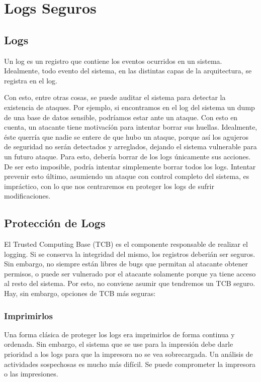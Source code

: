 \section{Logs Seguros}

\subsection{Logs}

Un log es un registro que contiene los eventos ocurridos en un sistema.
Idealmente, todo evento del sistema, en las distintas capas de la arquitectura, se registra en el log.

Con esto, entre otras cosas, se puede auditar el sistema para detectar la existencia de ataques. Por ejemplo, si encontramos en el log del sistema un dump de una base de datos sensible, podríamos estar ante un ataque.
Con esto en cuenta, un atacante tiene motivacíón para intentar borrar sus huellas. Idealmente, éste querría que nadie se entere de que hubo un ataque, porque así los agujeros de seguridad no serán detectados y arreglados, dejando el sistema vulnerable para un futuro ataque. Para esto, debería borrar de los logs únicamente sus acciones. De ser esto imposible, podría intentar simplemente borrar todos los logs. Intentar prevenir esto último, asumiendo un ataque con control completo del sistema, es impráctico, con lo que nos centraremos en proteger los logs de sufrir modificaciones.

\subsection{Protección de Logs}

El Trusted Computing Base (TCB) es el componente responsable de realizar el logging. 
Si se conserva la integridad del mismo, los registros deberián ser seguros. 
Sin embargo, no siempre están libres de bugs que permitan al atacante obtener permisos, o puede ser vulnerado por el atacante solamente porque ya tiene acceso al resto del sistema. Por esto, no conviene asumir que tendremos un TCB seguro.
Hay, sin embargo, opciones de TCB más seguras:

\subsubsection{Imprimirlos}

Una forma clásica de proteger los logs era imprimirlos de forma continua y ordenada. Sin embargo, el sistema que se use para la impresión debe darle prioridad a los logs para que la impresora no se vea sobrecargada.
Un análisis de actividades sospechosas es mucho más difícil.
Se puede comprometer la impresora o las impresiones.

